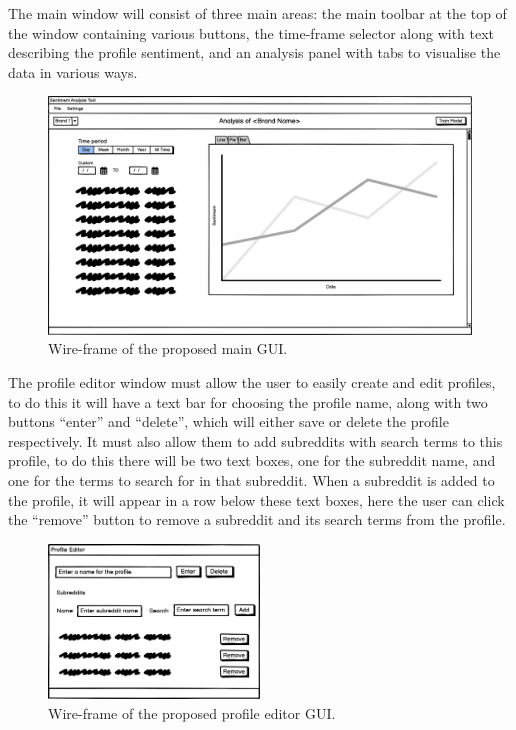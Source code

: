 The main window will consist of three main areas: the main toolbar at the top of the window containing various buttons, the time-frame selector along with text describing the profile sentiment, and an analysis panel with tabs to visualise the data in various ways.

\begin{figure}[h]
    \centering
    \includegraphics[width=\textwidth]{figures/wireframe-main.png}
    \caption{Wire-frame of the proposed main GUI.}
\end{figure}

The profile editor window must allow the user to easily create and edit profiles, to do this it will have a text bar for choosing the profile name, along with two buttons ``enter'' and ``delete'', which will either save or delete the profile respectively. It must also allow them to add subreddits with search terms to this profile, to do this there will be two text boxes, one for the subreddit name, and one for the terms to search for in that subreddit. When a subreddit is added to the profile, it will appear in a row below these text boxes, here the user can click the ``remove'' button to remove a subreddit and its search terms from the profile.

\begin{figure}[h]
    \centering
    \includegraphics[width=0.5\textwidth]{figures/wireframe-profile-editor.png}
    \caption{Wire-frame of the proposed profile editor GUI.}
\end{figure}

